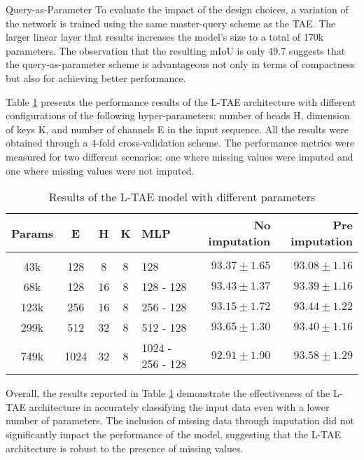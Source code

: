 \begin{paragraph} {Query-as-Parameter}
To evaluate the impact of the design choices, a variation of the network is trained using the same master-query scheme as the TAE.
The larger linear layer that results increases the model's size to a total of 170k parameters.
The observation that the resulting mIoU is only 49.7 suggests that the query-as-parameter scheme is advantageous not only in terms of compactness but also for achieving better performance.
\end{paragraph}

Table \ref{tab:LTAEresults} presents the performance results of the L-TAE architecture with different configurations of the following hyper-parameters: number of heads H, dimension of keys K, and number of channels E in the input sequence.
All the results were obtained through a 4-fold cross-validation scheme.
The performance metrics were measured for two different scenarios: one where missing values were imputed and one where missing values were not imputed.

\begin{table}[ht]
  \centering
  \begin{tabular}{cccclrr} 
     Params & E & H & K & MLP & No imputation & Pre imputation\\[0.2cm] 
     \hline \\[-0.2cm] 
     43k & 	128 & 	8 & 	8 & 	128 & 	$93.37 \pm 1.65$ & 	$93.08 \pm 1.16$\\ 
     68k & 	128 & 	16 & 	8 & 	128 - 128 & 	$93.43 \pm 1.37$ & 	$93.39 \pm 1.16$\\ 
     123k & 	256 & 	16 & 	8 & 	256 - 128 & 	$93.15 \pm 1.72$ & 	$93.44 \pm 1.22$\\ 
     299k & 	512 & 	32 & 	8 & 	512 - 128 & 	$\mathbf{93.65 \pm 1.30}$ & 	$93.40 \pm 1.16$\\ 
     749k & 	1024 & 	32 & 	8 & 	1024 - 256 - 128 & 	$92.91 \pm 1.90$ & 	$\mathbf{93.58 \pm 1.29}$\\ 
  \end{tabular}
  \caption{Results of the L-TAE model with different parameters}
  \label{tab:LTAEresults}
\end{table}

Overall, the results reported in Table \ref{tab:LTAEresults} demonstrate the effectiveness of the L-TAE architecture in accurately classifying the input data even with a lower number of parameters. 
The inclusion of missing data through imputation did not significantly impact the performance of the model, suggesting that the L-TAE architecture is robust to the presence of missing values.